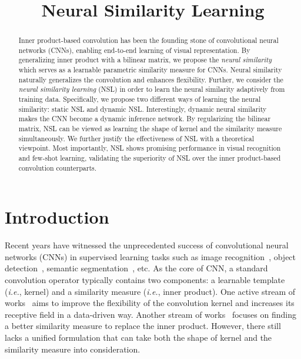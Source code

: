 \title{Neural Similarity Learning}

\begin{abstract}
Inner product-based convolution has been the founding stone of convolutional neural networks (CNNs), enabling end-to-end learning of visual representation. By generalizing inner product with a bilinear matrix, we propose the \emph{neural similarity} which serves as a learnable parametric similarity measure for CNNs. Neural similarity naturally generalizes the convolution and enhances flexibility. Further, we consider the \emph{neural similarity learning} (NSL) in order to learn the neural similarity adaptively from training data. Specifically, we propose two different ways of learning the neural similarity: static NSL and dynamic NSL. Interestingly, dynamic neural similarity makes the CNN  become a dynamic inference network. By regularizing the bilinear matrix, NSL can be viewed as learning the shape of kernel and the similarity measure simultaneously. We further justify the effectiveness of NSL with a theoretical viewpoint. Most importantly, NSL shows promising performance in visual recognition and few-shot learning, validating the superiority of NSL over the inner product-based convolution counterparts.
\end{abstract}

\section{Introduction}

Recent years have witnessed the unprecedented success of convolutional neural networks (CNNs) in supervised learning tasks such as image recognition~\cite{he2016deep}, object detection~\cite{ren2015faster}, semantic segmentation~\cite{long2015fully}, etc. As the core of CNN, a standard convolution operator typically contains two components: a learnable template (\emph{i.e.}, kernel) and a similarity measure (\emph{i.e.}, inner product). One active stream of works~\cite{dai2017deformable,zhu2018deformable,jeon2017active,yu2015multi,chen2018deeplab,su2017learning,jaderberg2015spatial,wu2018shift,jeon2018constructing} aims to improve the flexibility of the convolution kernel and increases its receptive field in a data-driven way. Another stream of works~\cite{liu2017hyper,liu2018decoupled} focuses on finding a better similarity measure to replace the inner product. However, there still lacks a unified formulation that can take both the shape of kernel and the similarity measure into consideration.
\par

